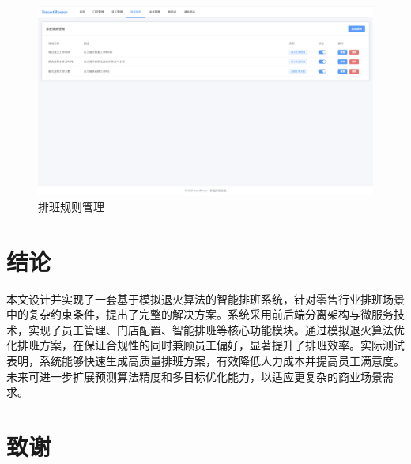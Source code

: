 \documentclass{ctexart}
\begin{document}
\begin{figure}[H]
    \centering
    \includegraphics[width=0.8\linewidth]{./source/排班规则管理.png}
    \caption{排班规则管理}
    \label{fig:microservice-arch}
\end{figure}




\section{结论}
本文设计并实现了一套基于模拟退火算法的智能排班系统，针对零售行业排班场景中的复杂约束条件，提出了完整的解决方案。系统采用前后端分离架构与微服务技术，实现了员工管理、门店配置、智能排班等核心功能模块。通过模拟退火算法优化排班方案，在保证合规性的同时兼顾员工偏好，显著提升了排班效率。实际测试表明，系统能够快速生成高质量排班方案，有效降低人力成本并提高员工满意度。未来可进一步扩展预测算法精度和多目标优化能力，以适应更复杂的商业场景需求。

\section*{致谢}




\appendix
{}

\end{document}
